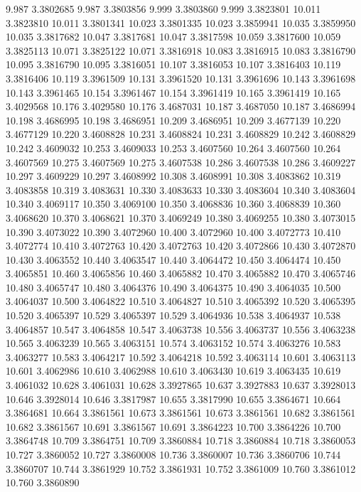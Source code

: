 9.987 3.3802685
9.987 3.3803856
9.999 3.3803860
9.999 3.3823801
10.011 3.3823810
10.011 3.3801341
10.023 3.3801335
10.023 3.3859941
10.035 3.3859950
10.035 3.3817682
10.047 3.3817681
10.047 3.3817598
10.059 3.3817600
10.059 3.3825113
10.071 3.3825122
10.071 3.3816918
10.083 3.3816915
10.083 3.3816790
10.095 3.3816790
10.095 3.3816051
10.107 3.3816053
10.107 3.3816403
10.119 3.3816406
10.119 3.3961509
10.131 3.3961520
10.131 3.3961696
10.143 3.3961698
10.143 3.3961465
10.154 3.3961467
10.154 3.3961419
10.165 3.3961419
10.165 3.4029568
10.176 3.4029580
10.176 3.4687031
10.187 3.4687050
10.187 3.4686994
10.198 3.4686995
10.198 3.4686951
10.209 3.4686951
10.209 3.4677139
10.220 3.4677129
10.220 3.4608828
10.231 3.4608824
10.231 3.4608829
10.242 3.4608829
10.242 3.4609032
10.253 3.4609033
10.253 3.4607560
10.264 3.4607560
10.264 3.4607569
10.275 3.4607569
10.275 3.4607538
10.286 3.4607538
10.286 3.4609227
10.297 3.4609229
10.297 3.4608992
10.308 3.4608991
10.308 3.4083862
10.319 3.4083858
10.319 3.4083631
10.330 3.4083633
10.330 3.4083604
10.340 3.4083604
10.340 3.4069117
10.350 3.4069100
10.350 3.4068836
10.360 3.4068839
10.360 3.4068620
10.370 3.4068621
10.370 3.4069249
10.380 3.4069255
10.380 3.4073015
10.390 3.4073022
10.390 3.4072960
10.400 3.4072960
10.400 3.4072773
10.410 3.4072774
10.410 3.4072763
10.420 3.4072763
10.420 3.4072866
10.430 3.4072870
10.430 3.4063552
10.440 3.4063547
10.440 3.4064472
10.450 3.4064474
10.450 3.4065851
10.460 3.4065856
10.460 3.4065882
10.470 3.4065882
10.470 3.4065746
10.480 3.4065747
10.480 3.4064376
10.490 3.4064375
10.490 3.4064035
10.500 3.4064037
10.500 3.4064822
10.510 3.4064827
10.510 3.4065392
10.520 3.4065395
10.520 3.4065397
10.529 3.4065397
10.529 3.4064936
10.538 3.4064937
10.538 3.4064857
10.547 3.4064858
10.547 3.4063738
10.556 3.4063737
10.556 3.4063238
10.565 3.4063239
10.565 3.4063151
10.574 3.4063152
10.574 3.4063276
10.583 3.4063277
10.583 3.4064217
10.592 3.4064218
10.592 3.4063114
10.601 3.4063113
10.601 3.4062986
10.610 3.4062988
10.610 3.4063430
10.619 3.4063435
10.619 3.4061032
10.628 3.4061031
10.628 3.3927865
10.637 3.3927883
10.637 3.3928013
10.646 3.3928014
10.646 3.3817987
10.655 3.3817990
10.655 3.3864671
10.664 3.3864681
10.664 3.3861561
10.673 3.3861561
10.673 3.3861561
10.682 3.3861561
10.682 3.3861567
10.691 3.3861567
10.691 3.3864223
10.700 3.3864226
10.700 3.3864748
10.709 3.3864751
10.709 3.3860884
10.718 3.3860884
10.718 3.3860053
10.727 3.3860052
10.727 3.3860008
10.736 3.3860007
10.736 3.3860706
10.744 3.3860707
10.744 3.3861929
10.752 3.3861931
10.752 3.3861009
10.760 3.3861012
10.760 3.3860890
